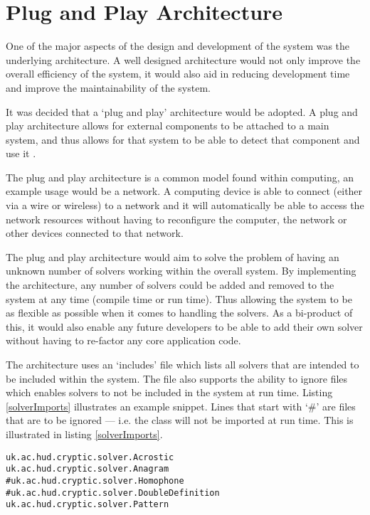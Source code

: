 \section{Plug and Play Architecture}
\label{sec:plug_and_play_architecture}

One of the major aspects of the design and development of the system was the 
underlying architecture. A well designed architecture would not only improve the
overall efficiency of the system, it would also aid in reducing development time
and improve the maintainability of the system.

It was decided that a `plug and play' architecture would be adopted. A plug and
play architecture allows for external components to be attached to a main 
system, and thus allows for that system to be able to detect that component and 
use it \citep{plug_play}.

The plug and play architecture is a common model found within computing, an 
example usage would be a network. A computing device is able to connect 
(either via a wire or wireless) to a network and it will automatically be able 
to access the network resources without having to reconfigure the computer, the 
network or other devices connected to that network.

The plug and play architecture would aim to solve the problem of having an 
unknown number of solvers working within the overall system. By implementing the
architecture, any number of solvers could be added and removed to the system at
any time (compile time or run time). Thus allowing the system to be as flexible 
as possible when it comes to handling the solvers. As a bi-product of this, it 
would also enable any future developers to be able to add their own solver 
without having to re-factor any core application code.

The architecture uses an `includes' file which lists all solvers that are 
intended to be included within the system. The file also supports the ability to
ignore files which enables solvers to not be included in the system at run time.
Listing \ref{solverImports} illustrates an example snippet. Lines that start 
with `\#' are files that are to be ignored --- i.e. the class will not be 
imported at run time. This is illustrated in listing \ref{solverImports}.

\begin{lstlisting}[caption={plug and play solver import file}, label=solverImports]  
uk.ac.hud.cryptic.solver.Acrostic
uk.ac.hud.cryptic.solver.Anagram
#uk.ac.hud.cryptic.solver.Homophone
#uk.ac.hud.cryptic.solver.DoubleDefinition
uk.ac.hud.cryptic.solver.Pattern
\end{lstlisting}

